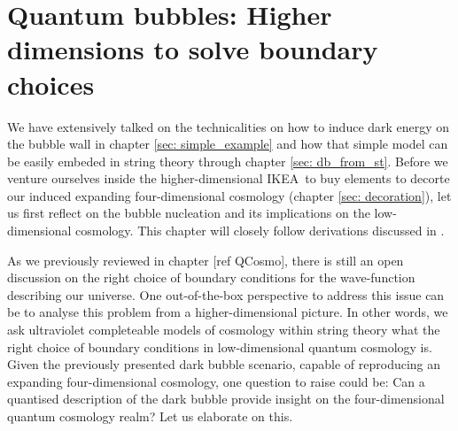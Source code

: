 \section{Quantum bubbles: Higher dimensions to solve boundary choices}\label{sec: quantum_bubbles}
We have extensively talked on the technicalities on how to induce dark energy on the bubble wall in chapter \ref{sec: simple_example} and how that simple model can be easily embeded in string theory through chapter \ref{sec: db_from_st}. Before we venture ourselves inside the higher-dimensional IKEA\texttrademark \, to buy elements to decorte our induced expanding four-dimensional cosmology (chapter \ref{sec: decoration}), let us first reflect on the bubble nucleation and its implications on the low-dimensional cosmology. This chapter will closely follow derivations discussed in \cite{Danielsson:2021aa}.

As we previously reviewed in chapter [ref QCosmo], there is still an open discussion on the right choice of boundary conditions for the wave-function describing our universe. One out-of-the-box perspective to address this issue can be to analyse this problem from a higher-dimensional picture. In other words, we ask ultraviolet completeable models of cosmology within string theory what the right choice of boundary conditions in low-dimensional quantum cosmology is. Given the previously presented dark bubble scenario, capable of reproducing an expanding four-dimensional cosmology, one question to raise could be: Can a quantised description of the dark bubble provide insight on the four-dimensional quantum cosmology realm? Let us elaborate on this.

